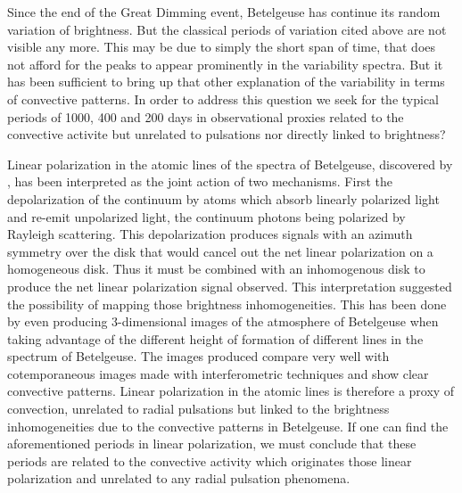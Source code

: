\documentclass{aa}
\begin{document}
Since the end of the Great Dimming event, Betelgeuse has continue its random variation of brightness. But the classical periods 
of variation cited above are not visible any more. This may be due to simply the short span of time, that does not afford for 
the peaks to appear prominently in the variability spectra. But it has been sufficient to bring up that other explanation of the variability
in terms  of convective patterns. In order to address this question we seek for the typical periods of 1000, 400 and 200 days in  
observational proxies related to the convective activite but unrelated to pulsations nor directly linked to brightness?

Linear polarization in the atomic lines of the spectra of Betelgeuse, discovered by \cite{auriere_discovery_2016}, has been interpreted as the joint action of 
two mechanisms. First the depolarization of the continuum by atoms which absorb linearly polarized light and re-emit unpolarized light, the 
continuum photons being polarized by Rayleigh scattering. This depolarization produces signals with an azimuth symmetry over the disk that 
would  cancel out the net linear polarization on a homogeneous disk. Thus it must be combined with an inhomogenous disk to produce the net linear polarization 
signal observed. This interpretation suggested the possibility of mapping those brightness inhomogeneities. This has been done by \cite{lopez_ariste_convective_2018} 
even producing 3-dimensional images of the atmosphere of Betelgeuse \citep{lopez_ariste_three-dimensional_2022} when taking advantage of the different height of formation of 
different lines in the spectrum of Betelgeuse. The images produced compare very well with cotemporaneous images made with interferometric 
techniques and show clear convective patterns. Linear polarization in the atomic lines is therefore a proxy of convection, unrelated to radial 
pulsations but linked to the brightness inhomogeneities due to the convective patterns in Betelgeuse. If one can find the aforementioned periods 
in linear polarization, we must conclude that these periods are related to the convective activity which originates those linear polarization 
and unrelated to any radial pulsation phenomena.
\end{document}
